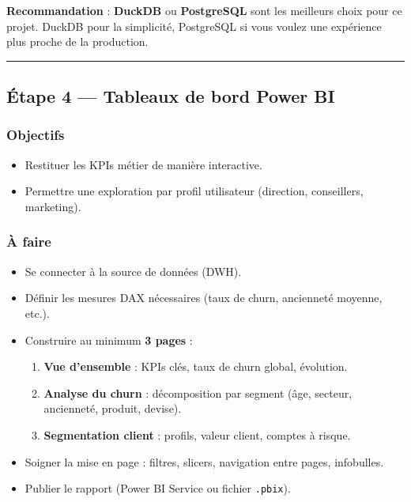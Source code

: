 \documentclass[11pt,a4paper]{article}
\renewenvironment{quote}{\begin{quotebox}}{\end{quotebox}}
\providecommand{\tightlist}{\setlength{\itemsep}{0pt}\setlength{\parskip}{0pt}}
\begin{document}
\begin{quote}
\textbf{Recommandation} : \textbf{DuckDB} ou \textbf{PostgreSQL} sont
les meilleurs choix pour ce projet. DuckDB pour la simplicité,
PostgreSQL si vous voulez une expérience plus proche de la production.
\end{quote}

\begin{center}\rule{0.5\linewidth}{0.5pt}\end{center}

\subsection{Étape 4 --- Tableaux de bord Power
BI}\label{uxe9tape-4-tableaux-de-bord-power-bi}

\subsubsection{Objectifs}\label{objectifs-4}

\begin{itemize}
\tightlist
\item
  Restituer les KPIs métier de manière interactive.
\item
  Permettre une exploration par profil utilisateur (direction,
  conseillers, marketing).
\end{itemize}

\subsubsection{À faire}\label{uxe0-faire-4}

\begin{itemize}
\tightlist
\item
  Se connecter à la source de données (DWH).
\item
  Définir les mesures DAX nécessaires (taux de churn, ancienneté
  moyenne, etc.).
\item
  Construire au minimum \textbf{3 pages} :

  \begin{enumerate}
  \def\labelenumi{\arabic{enumi}.}
  \tightlist
  \item
    \textbf{Vue d'ensemble} : KPIs clés, taux de churn global,
    évolution.
  \item
    \textbf{Analyse du churn} : décomposition par segment (âge, secteur,
    ancienneté, produit, devise).
  \item
    \textbf{Segmentation client} : profils, valeur client, comptes à
    risque.
  \end{enumerate}
\item
  Soigner la mise en page : filtres, slicers, navigation entre pages,
  infobulles.
\item
  Publier le rapport (Power BI Service ou fichier \texttt{.pbix}).
\end{itemize}
\end{document}
